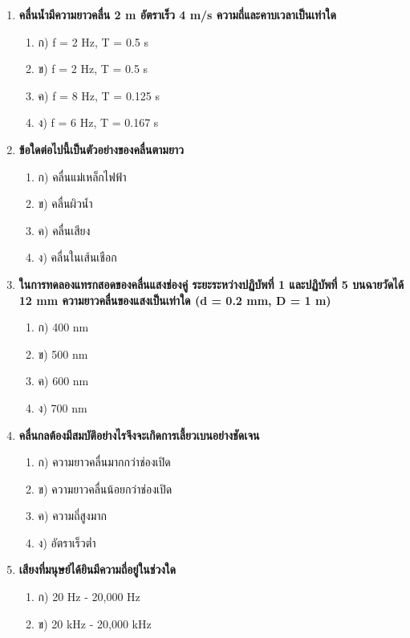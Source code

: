 \documentclass[12pt]{article}
\begin{document}
\begin{enumerate}
\begin{enumerate}
\item ก) มีความหนาแน่นเท่ากัน
\item ข) มีความหนาแน่นต่างกัน
\item ค) มีอุณหภูมิเท่ากัน
\item ง) มีความดันเท่ากัน
\end{enumerate}
\item \textbf{คลื่นน้ำมีความยาวคลื่น 2 m อัตราเร็ว 4 m/s ความถี่และคาบเวลาเป็นเท่าใด}
\begin{enumerate}
\item ก) f = 2 Hz, T = 0.5 s
\item ข) f = 2 Hz, T = 0.5 s
\item ค) f = 8 Hz, T = 0.125 s
\item ง) f = 6 Hz, T = 0.167 s
\end{enumerate}
\item \textbf{ข้อใดต่อไปนี้เป็นตัวอย่างของคลื่นตามยาว}
\begin{enumerate}
\item ก) คลื่นแม่เหล็กไฟฟ้า
\item ข) คลื่นผิวน้ำ
\item ค) คลื่นเสียง
\item ง) คลื่นในเส้นเชือก
\end{enumerate}
\item \textbf{ในการทดลองแทรกสอดของคลื่นแสงช่องคู่ ระยะระหว่างปฏิบัพที่ 1 และปฏิบัพที่ 5 บนฉายวัดได้ 12 mm ความยาวคลื่นของแสงเป็นเท่าใด (d = 0.2 mm, D = 1 m)}
\begin{enumerate}
\item ก) 400 nm
\item ข) 500 nm
\item ค) 600 nm
\item ง) 700 nm
\end{enumerate}
\item \textbf{คลื่นกลต้องมีสมบัติอย่างไรจึงจะเกิดการเลี้ยวเบนอย่างชัดเจน}
\begin{enumerate}
\item ก) ความยาวคลื่นมากกว่าช่องเปิด
\item ข) ความยาวคลื่นน้อยกว่าช่องเปิด
\item ค) ความถี่สูงมาก
\item ง) อัตราเร็วต่ำ
\end{enumerate}
\item \textbf{เสียงที่มนุษย์ได้ยินมีความถี่อยู่ในช่วงใด}
\begin{enumerate}
\item ก) 20 Hz - 20,000 Hz
\item ข) 20 kHz - 20,000 kHz

\end{enumerate}
\end{enumerate}
\end{document}
